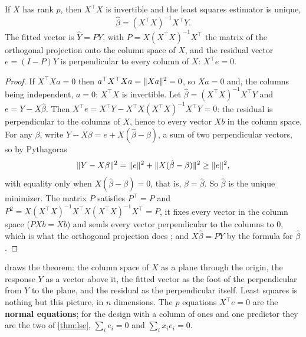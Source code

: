 \begin{theorem}
\label{thm:mreg-lse}
If $X$ has rank $p$, then $X^\top X$ is invertible and the least squares estimator is unique,
\[
\hat{\beta} = (X^\top X)^{-1}X^\top Y.
\]
The fitted vector is $\hat{Y} = PY$, with $P = X(X^\top X)^{-1}X^\top$ the matrix of the orthogonal projection onto the column space of $X$, and the residual vector $e = (I - P)Y$ is perpendicular to every column of $X$: $X^\top e = 0$.
\end{theorem}
\begin{proof}
If $X^\top Xa = 0$ then $a^\top X^\top Xa = \lVert Xa\rVert^2 = 0$, so $Xa = 0$ and, the columns being independent, $a = 0$: $X^\top X$ is invertible.
Let $\hat{\beta} = (X^\top X)^{-1}X^\top Y$ and $e = Y - X\hat{\beta}$.
Then $X^\top e = X^\top Y - X^\top X(X^\top X)^{-1}X^\top Y = 0$: the residual is perpendicular to the columns of $X$, hence to every vector $Xb$ in the column space.
For any $\beta$, write $Y - X\beta = e + X(\hat{\beta} - \beta)$, a sum of two perpendicular vectors, so by Pythagoras
\[
\lVert Y - X\beta\rVert^2 = \lVert e\rVert^2 + \lVert X(\hat{\beta} - \beta)\rVert^2 \geq \lVert e\rVert^2,
\]
with equality only when $X(\hat{\beta} - \beta) = 0$, that is, $\beta = \hat{\beta}$.
So $\hat{\beta}$ is the unique minimizer.
The matrix $P$ satisfies $P^\top = P$ and $P^2 = X(X^\top X)^{-1}X^\top X(X^\top X)^{-1}X^\top = P$, it fixes every vector in the column space ($PXb = Xb$) and sends every vector perpendicular to the columns to $0$, which is what the orthogonal projection does ; and $X\hat{\beta} = PY$ by the formula for $\hat{\beta}$.
\end{proof}

 draws the theorem: the column space of $X$ as a plane through the origin, the response $Y$ as a vector above it, the fitted vector as the foot of the perpendicular from $Y$ to the plane, and the residual as the perpendicular itself.
Least squares is nothing but this picture, in $n$ dimensions.
The $p$ equations $X^\top e = 0$ are the \textbf{normal equations}; for the design with a column of ones and one predictor they are the two of \cref{thm:lse}, $\sum_i e_i = 0$ and $\sum_i x_ie_i = 0$.

